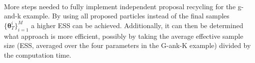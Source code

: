 \documentclass[12,fleqn]{article}
\theoremstyle{definition}
\theoremstyle{plain}
\begin{document}
\paragraph{}
More steps needed to fully implement independent proposal recycling for the g-and-k example. By using all proposed particles instead of the final samples $\{ \boldsymbol{\theta}^i_T \}^M_{i=1}$ a higher ESS can be achieved. Additionally, it can then be determined what approach is more efficient, possibly by taking the average effective sample size (ESS, averaged over the four parameters in the G-ank-K example) divided by the computation time. 
\par




\appendix

%
\setlength{\bibleftmargin}{.125in}
\setlength{\bibindent}{-\bibleftmargin}


%
\end{document}
